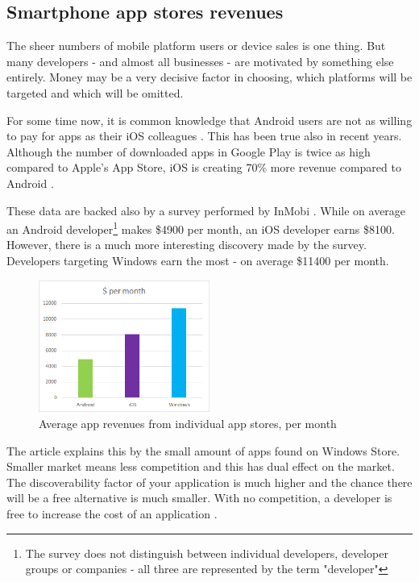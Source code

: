 \documentclass[english,master,public,dept460,male,cpdeclaration,oneside]{diploma}
\begin{document}
\subsection{Smartphone app stores revenues}
The sheer numbers of mobile platform users or device sales is one thing. But many developers - and almost all businesses - are motivated by something else entirely. Money may be a very decisive factor in choosing, which platforms will be targeted and which will be omitted. 

For some time now, it is common knowledge that Android users are not as willing to pay for apps as their iOS colleagues \cite{iosUsersPay}. This has been true also in recent years. Although the number of downloaded apps in Google Play is twice as high compared to Apple’s App Store, iOS is creating 70\% more revenue compared to Android \cite{iosAndroidStore}. 

These data are backed also by a survey performed by InMobi \cite{lifehackerRevenues}. While on average an Android developer\footnote{The survey does not distinguish between individual developers, developer groups or companies - all three are represented by the term "developer"} makes \$4900 per month, an iOS developer earns \$8100. However, there is a much more interesting discovery made by the survey. Developers targeting Windows earn the most - on average \$11400 per month.

\begin{figure}
	\centering\includegraphics[width=0.5\textwidth]{Figures/appRevenues.png}
	\caption{Average app revenues from individual app stores, per month}
	\label{figure:appRevenues}
\end{figure}

The article explains this by the small amount of apps found on Windows Store. Smaller market means less competition and this has dual effect on the market. The discoverability factor of your application is much higher and the chance there will be a free alternative is much smaller. With no competition, a developer is free to increase the cost of an application \cite{appsInStores}.
\end{document}
